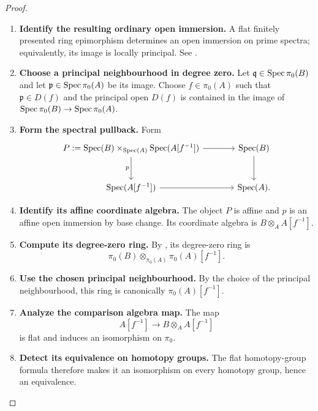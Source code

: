 \begin{proof}
\begin{enumerate}[label=\textup{(\arabic*)}]
    \item \textbf{Identify the resulting ordinary open immersion.}
    A flat
    finitely presented ring epimorphism determines an open immersion on prime
    spectra; equivalently, its image is locally principal. See
    \cite{LurieSAG}.

    \item \textbf{Choose a principal neighbourhood in degree zero.}
    Let \(\mathfrak q\in\operatorname{Spec}\pi_0(B)\) and let
    \(\mathfrak p\in\operatorname{Spec}\pi_0(A)\) be its image. Choose
    \(f\in\pi_0(A)\) such that \(\mathfrak p\in D(f)\) and the principal
    open \(D(f)\) is contained in the image of
    \(\operatorname{Spec}\pi_0(B)\to\operatorname{Spec}\pi_0(A)\).

    \item \textbf{Form the spectral pullback.}
    Form
    \[
    \begin{tikzcd}[column sep=large, row sep=large]
        P:=\Spec(B)\times_{\Spec(A)}\Spec(A[f^{-1}])
            \arrow[r]
            \arrow[d, "p"']
        &
        \Spec(B) \arrow[d]
        \\
        \Spec(A[f^{-1}]) \arrow[r]
        &
        \Spec(A).
    \end{tikzcd}
    \]

    \item \textbf{Identify its affine coordinate algebra.}
    The object \(P\) is affine and \(p\) is an affine open immersion by
    base change. Its coordinate algebra is
    \(B\otimes_AA[f^{-1}]\).

    \item \textbf{Compute its degree-zero ring.}
    By
    , its degree-zero ring
    is
    \[
        \pi_0(B)\otimes_{\pi_0(A)}\pi_0(A)[f^{-1}].
    \]

    \item \textbf{Use the chosen principal neighbourhood.}
    By the choice of the principal neighbourhood, this ring is canonically
    \(\pi_0(A)[f^{-1}]\).

    \item \textbf{Analyze the comparison algebra map.}
    The map
    \[
        A[f^{-1}]
        \longrightarrow
        B\otimes_AA[f^{-1}]
    \]
    is flat and induces an isomorphism on \(\pi_0\).

    \item \textbf{Detect its equivalence on homotopy groups.}
    The flat
    homotopy-group formula therefore makes it an isomorphism on every
    homotopy group, hence an equivalence.


\end{enumerate}
\end{proof}
